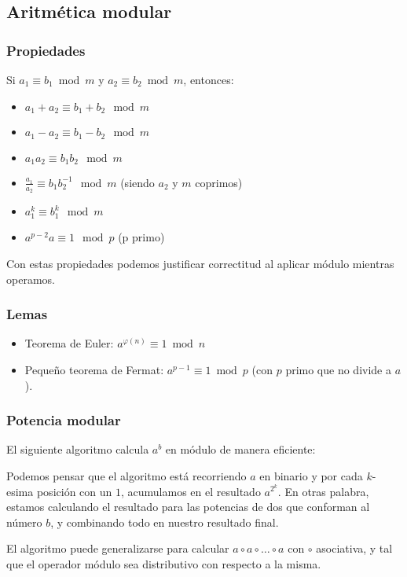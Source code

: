 
\subsection{Aritmética modular}

\subsubsection*{Propiedades}

Si $a_1 \equiv b_1 \bmod m$ y $a_2 \equiv b_2 \bmod m$, entonces: 
\begin{itemize}
	\item $a_1 + a_2 \equiv b_1 + b_2 \mod m$
	\item $a_1 - a_2 \equiv b_1 - b_2 \mod m$
	\item $a_1 a_2 \equiv b_1 b_2 \mod m$
	\item $\frac{a_1}{a_2} \equiv b_1 b_2^{-1} \mod m$ \quad (siendo $a_2$ y $m$ coprimos)
	\item $a_1^k \equiv b_1^k \mod m$
	\item $a^{p-2} a \equiv 1 \mod p $ \quad (p primo)
\end{itemize}

Con estas propiedades podemos justificar correctitud al aplicar módulo mientras operamos.

\subsubsection*{Lemas}

\begin{itemize}
	\item Teorema de Euler: $a^{\varphi{(n)}} \equiv 1 \bmod n$
	\item Pequeño teorema de Fermat: $a^{p-1} \equiv 1 \bmod p$ (con $p$ primo que no divide a $a$).
\end{itemize}

\subsubsection*{Potencia modular}

El siguiente algoritmo calcula $a^b$ en módulo de manera eficiente:


Podemos pensar que el algoritmo está recorriendo $a$ en binario y por cada $k$-esima posición con un $1$, acumulamos en el resultado $a^{2^k}$. En otras palabra, estamos calculando el resultado para las potencias de dos que conforman al número $b$, y combinando todo en nuestro resultado final.

El algoritmo puede generalizarse para calcular $a \circ a \circ \dots \circ a$ con $\circ$ asociativa, y tal que el operador módulo sea distributivo con respecto a la misma.


